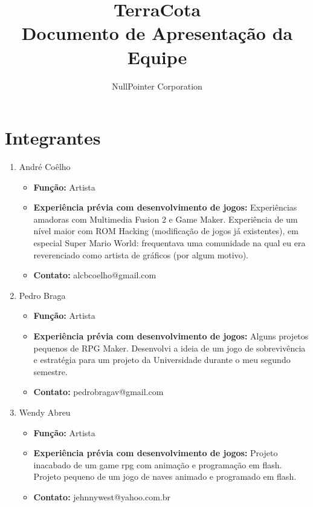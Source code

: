 \documentclass[11pt]{article}
\begin{document}
\title{TerraCota \\
Documento de Apresentação da Equipe}
\author{NullPointer Corporation}
\date{}
\maketitle


\section{Integrantes}

\begin{enumerate}

\item André Coêlho

\begin{itemize}
\item \textbf{Função:} Artista
\item \textbf{Experiência prévia com desenvolvimento de jogos:}
	Experiências amadoras com Multimedia Fusion 2 e Game Maker. Experiência 
	de um nível maior com ROM Hacking (modificação de jogos já existentes), 
	em especial Super Mario World: frequentava uma comunidade na qual eu era 
	reverenciado como artista de gráficos (por algum motivo).
\item \textbf{Contato:} alcbcoelho@gmail.com
\end{itemize}

\item Pedro Braga

\begin{itemize}
\item \textbf{Função:} Artista
\item \textbf{Experiência prévia com desenvolvimento de jogos:}
	Alguns projetos pequenos de RPG Maker. Desenvolvi a ideia de um jogo
	de sobrevivência e estratégia para um projeto da Universidade durante
	o meu segundo semestre.
\item \textbf{Contato:} pedrobragav@gmail.com
\end{itemize}

\item Wendy Abreu

\begin{itemize}
\item \textbf{Função:} Artista
\item \textbf{Experiência prévia com desenvolvimento de jogos:}
	Projeto inacabado de um game rpg com animação e programação em flash. 
	Projeto pequeno de um jogo de naves animado e programado em flash.
\item \textbf{Contato:} jehnnywest@yahoo.com.br
\end{itemize}


\end{enumerate}
\end{document}
